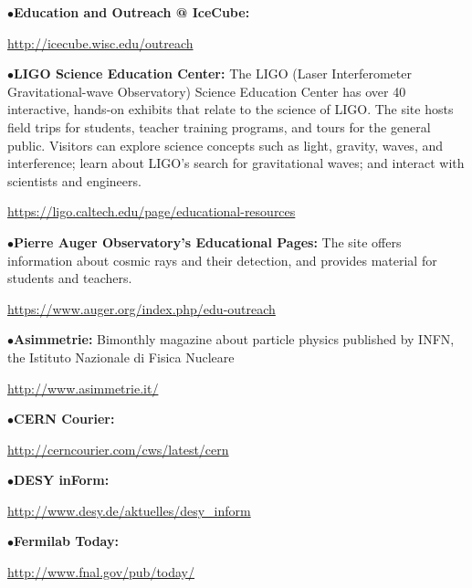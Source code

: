 \smallskip

\item{$\bullet$}{\bf Education and Outreach @ IceCube:}
    \item{}\qquad\url{http://icecube.wisc.edu/outreach}


\smallskip

\item{$\bullet$}{\bf LIGO Science Education Center:}
The LIGO (Laser Interferometer
Gravitational-wave Observatory) Science Education Center has over
40 interactive, hands-on exhibits that relate to the science of LIGO. The
site hosts field trips for students, teacher training programs, and tours
for the general public. Visitors can explore science concepts such as
light, gravity, waves, and interference; learn about LIGO's search for
gravitational waves; and interact with scientists and engineers.
     \item{}\qquad\url{https://ligo.caltech.edu/page/educational-resources}


\smallskip

\item{$\bullet$}{\bf Pierre Auger Observatory's Educational Pages:}
The site offers information about cosmic rays and their detection, and provides material for students and teachers.
     \item{}\qquad\url{https://www.auger.org/index.php/edu-outreach}

\medskip
\medskip



\medskip


\item{$\bullet$}{\bf Asimmetrie:}
Bimonthly magazine about particle physics published by INFN, the Istituto Nazionale di Fisica Nucleare
	\item{}\qquad\url{http://www.asimmetrie.it/}
\medskip

\item{$\bullet$}{\bf CERN Courier:}
	\item{}\qquad\url{http://cerncourier.com/cws/latest/cern}
\medskip

\item{$\bullet$}{\bf DESY inForm:}
	\item{}\qquad\url{http://www.desy.de/aktuelles/desy_inform}
\medskip

\item{$\bullet$}{\bf Fermilab Today:}
	\item{}\qquad\url{http://www.fnal.gov/pub/today/}
\medskip


